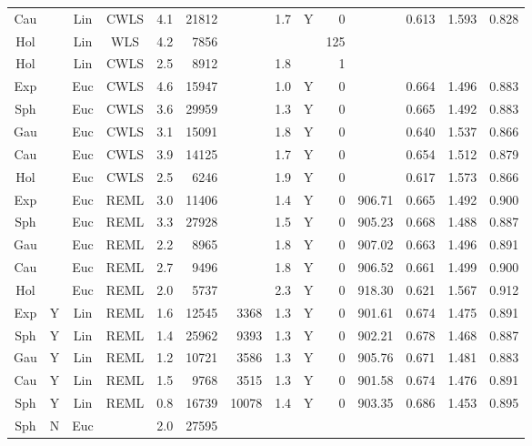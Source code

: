 \documentclass[11pt, titlepage]{article}\usepackage[]{graphicx}\usepackage[]{color}
\begin{document}
\begin{spacing}{1.9}
\begin{flushleft}
\begin{table}[ht]
\begin{center}
\begin{tabular}{cc|cc|rrrr|rr|rrrr}
  Cau &  & Lin & CWLS & 4.1 & 21812 &  & 1.7 & Y & 0 &  & 0.613 & 1.593 & 0.828 \\ 
  Hol &  & Lin & WLS & 4.2 & 7856 &  &  &   & 125 &  &  &  &  \\ 
  Hol &  & Lin & CWLS & 2.5 & 8912 &  & 1.8 &   & 1 &  &  &  &  \\ 
  Exp &  & Euc & CWLS & 4.6 & 15947 &  & 1.0 & Y & 0 &  & 0.664 & 1.496 & 0.883 \\ 
  Sph &  & Euc & CWLS & 3.6 & 29959 &  & 1.3 & Y & 0 &  & 0.665 & 1.492 & 0.883 \\ 
  Gau &  & Euc & CWLS & 3.1 & 15091 &  & 1.8 & Y & 0 &  & 0.640 & 1.537 & 0.866 \\ 
  Cau &  & Euc & CWLS & 3.9 & 14125 &  & 1.7 & Y & 0 &  & 0.654 & 1.512 & 0.879 \\ 
  Hol &  & Euc & CWLS & 2.5 & 6246 &  & 1.9 & Y & 0 &  & 0.617 & 1.573 & 0.866 \\ 
  Exp &  & Euc & REML & 3.0 & 11406 &  & 1.4 & Y & 0 & 906.71 & 0.665 & 1.492 & 0.900 \\ 
  Sph &  & Euc & REML & 3.3 & 27928 &  & 1.5 & Y & 0 & 905.23 & 0.668 & 1.488 & 0.887 \\ 
  Gau &  & Euc & REML & 2.2 & 8965 &  & 1.8 & Y & 0 & 907.02 & 0.663 & 1.496 & 0.891 \\ 
  Cau &  & Euc & REML & 2.7 & 9496 &  & 1.8 & Y & 0 & 906.52 & 0.661 & 1.499 & 0.900 \\ 
  Hol &  & Euc & REML & 2.0 & 5737 &  & 2.3 & Y & 0 & 918.30 & 0.621 & 1.567 & 0.912 \\ 
  Exp & Y & Lin & REML & 1.6 & 12545 & 3368 & 1.3 & Y & 0 & 901.61 & 0.674 & 1.475 & 0.891 \\ 
  Sph & Y & Lin & REML & 1.4 & 25962 & 9393 & 1.3 & Y & 0 & 902.21 & 0.678 & 1.468 & 0.887 \\ 
  Gau & Y & Lin & REML & 1.2 & 10721 & 3586 & 1.3 & Y & 0 & 905.76 & 0.671 & 1.481 & 0.883 \\ 
  Cau & Y & Lin & REML & 1.5 & 9768 & 3515 & 1.3 & Y & 0 & 901.58 & 0.674 & 1.476 & 0.891 \\ 
   \hline

  \hline
Sph & Y & Lin & REML & 0.8 & 16739 & 10078 & 1.4 & Y & 0 & 903.35 & 0.686 & 1.453 & 0.895 \\ 
  Sph & N & Euc &   & 2.0 & 27595 &  &  &  &  &  &  &  &  \\ 
   \hline

\end{tabular}
\end{center}
\end{table}


\end{flushleft}
\end{spacing}
\end{document}
